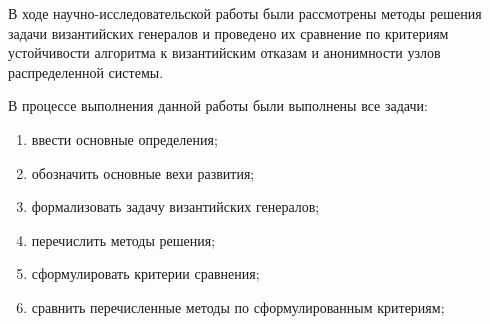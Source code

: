 
В ходе научно-исследовательской работы были рассмотрены методы решения задачи византийских генералов и проведено их сравнение по критериям устойчивости алгоритма к византийским отказам и анонимности узлов распределенной системы.

В процессе выполнения данной работы были выполнены все задачи:
\begin{enumerate}[label={\arabic*)}]
	\item ввести основные определения;
	\item обозначить основные вехи развития;
	\item формализовать задачу византийских генералов;
	\item перечислить методы решения;
	\item сформулировать критерии сравнения;
	\item сравнить перечисленные методы по сформулированным критериям;
\end{enumerate}
